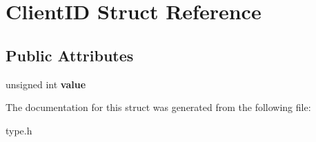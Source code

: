 \hypertarget{structClientID}{
\section{ClientID Struct Reference}
\label{structClientID}
}
\subsection*{Public Attributes}
\begin{DoxyCompactItemize}
\item 
\hypertarget{structClientID_aed887b4c80b8cb78ed9c35db460eb9cf}{
unsigned int {\bfseries value}}
\label{structClientID_aed887b4c80b8cb78ed9c35db460eb9cf}

\end{DoxyCompactItemize}


The documentation for this struct was generated from the following file:\begin{DoxyCompactItemize}
\item 
type.h\end{DoxyCompactItemize}
